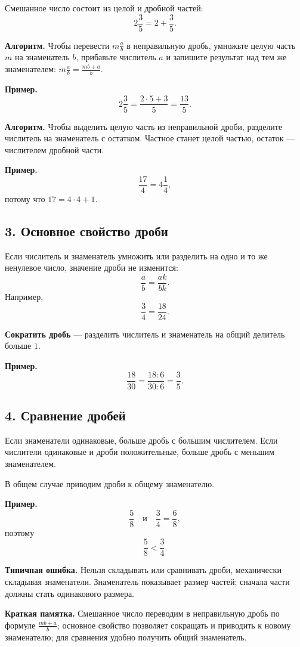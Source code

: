 \documentclass[12pt,a4paper]{article}
\newcommand{\term}[1]{\textbf{\textcolor{graphite}{#1}}}
\newcommand{\algorithm}[1]{%
  \par\smallskip
  {\color{accent}\textbf{Алгоритм.}} #1\par\smallskip
}
\newcommand{\mistake}[1]{%
  \par\smallskip
  {\color{accent}\textbf{Типичная ошибка.}} #1\par\smallskip
}
\newcommand{\memo}[1]{%
  \par\smallskip
  \begingroup
  \setlength{\fboxsep}{7pt}%
  \colorbox{accentlight}{\parbox{0.94\textwidth}{\textbf{Краткая памятка.} #1}}%
  \endgroup
  \par\smallskip
}
\begin{document}
Смешанное число состоит из целой и дробной частей:
\[
2\frac35=2+\frac35.
\]

\algorithm{Чтобы перевести $m\frac ab$ в неправильную дробь, умножьте целую часть $m$ на знаменатель $b$, прибавьте числитель $a$ и запишите результат над тем же знаменателем: $m\frac ab=\frac{mb+a}{b}$.}

\textbf{Пример.}
\[
2\frac35=\frac{2\cdot5+3}{5}=\frac{13}{5}.
\]

\algorithm{Чтобы выделить целую часть из неправильной дроби, разделите числитель на знаменатель с остатком. Частное станет целой частью, остаток --- числителем дробной части.}

\textbf{Пример.}
\[
\frac{17}{4}=4\frac14,
\]
потому что $17=4\cdot4+1$.

\subsection*{3. Основное свойство дроби}
Если числитель и знаменатель умножить или разделить на одно и то же ненулевое число, значение дроби не изменится:
\[
\frac ab=\frac{ak}{bk}.
\]
Например,
\[
\frac34=\frac{18}{24}.
\]

\term{Сократить дробь} --- разделить числитель и знаменатель на общий делитель больше $1$.

\textbf{Пример.}
\[
\frac{18}{30}=\frac{18:6}{30:6}=\frac35.
\]

\subsection*{4. Сравнение дробей}
Если знаменатели одинаковые, больше дробь с большим числителем. Если числители одинаковые и дроби положительные, больше дробь с меньшим знаменателем.

В общем случае приводим дроби к общему знаменателю.

\textbf{Пример.}
\[
\frac58\quad\text{и}\quad\frac34=\frac68,
\]
поэтому
\[
\frac58<\frac34.
\]

\mistake{Нельзя складывать или сравнивать дроби, механически складывая знаменатели. Знаменатель показывает размер частей; сначала части должны стать одинакового размера.}

\memo{Смешанное число переводим в неправильную дробь по формуле $\frac{mb+a}{b}$; основное свойство позволяет сокращать и приводить к новому знаменателю; для сравнения удобно получить общий знаменатель.}
\end{document}
